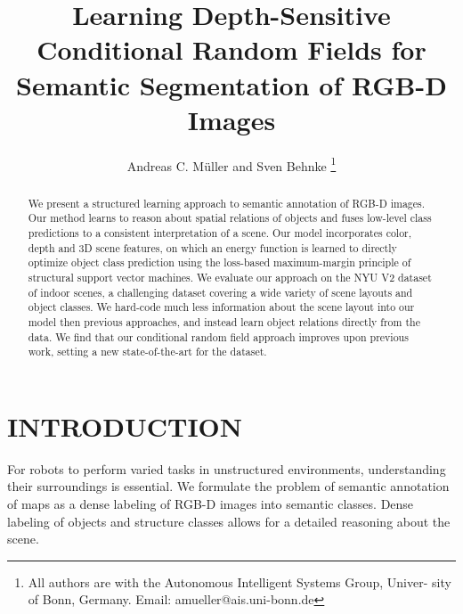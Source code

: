 \documentclass[a4paper, 10pt, conference]{ieeeconf}      %
\title{\LARGE \bf
Learning Depth-Sensitive Conditional Random Fields for Semantic Segmentation of RGB-D Images
}
\author{Andreas C. M\"uller and Sven Behnke
\thanks{All authors are with the Autonomous Intelligent Systems Group, Univer-
        sity of Bonn, Germany. Email: amueller@ais.uni-bonn.de
    }}
\begin{document}
\maketitle
\thispagestyle{empty}
\pagestyle{empty}


\begin{abstract}
    We present a structured learning approach to semantic annotation of RGB-D
    images. 
    Our method learns to reason about spatial relations of objects and
    fuses low-level class predictions to a consistent interpretation of a
    scene. Our model incorporates color, depth and 3D scene features, on which
    an energy function is learned to directly optimize object class prediction using
    the loss-based maximum-margin principle of structural support vector machines.
    We evaluate our approach on the NYU V2 dataset of indoor scenes, a challenging
    dataset covering a wide variety of scene layouts and object classes. We
    hard-code much less information about the scene layout into our model then previous
    approaches, and instead learn object relations directly from the data. We
    find that our conditional random field approach improves upon previous
    work, setting a new state-of-the-art for the dataset.
\end{abstract}


\section{INTRODUCTION}
For robots to perform varied tasks in unstructured environments, understanding their
surroundings is essential. We formulate the problem of semantic annotation of maps
as a dense labeling of RGB-D images into semantic classes. Dense labeling of objects
and structure classes allows for a detailed reasoning about the scene.
\end{document}
